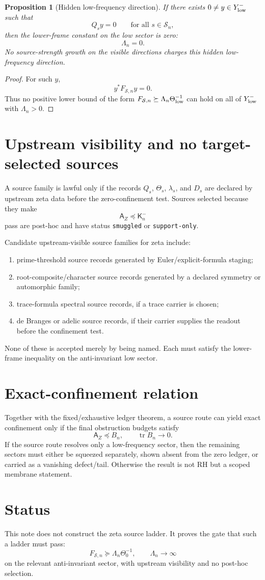 \documentclass[11pt]{article}
\newtheorem{proposition}{Proposition}
\newcommand{\K}{\mathsf K}
\newcommand{\A}{\mathsf A}
\newcommand{\tr}{\operatorname{tr}}
\begin{document}
\begin{proposition}[Hidden low-frequency direction]
If there exists $0\ne y\in Y^-_{\rm low}$ such that
\[
Q_s y=0
\qquad\text{for all }s\in\mathcal S_n,
\]
then the lower-frame constant on the low sector is zero:
\[
\Lambda_n=0.
\]
No source-strength growth on the visible directions charges this hidden low-frequency direction.
\end{proposition}

\begin{proof}
For such $y$,
\[
y^*F_{\mathcal S,n}y=0.
\]
Thus no positive lower bound of the form $F_{\mathcal S,n}\succeq\Lambda_n\Theta_{\rm low}^{-1}$ can hold on all of $Y^-_{\rm low}$ with $\Lambda_n>0$.\end{proof}

\section{Upstream visibility and no target-selected sources}
A source family is lawful only if the records $Q_s$, $\Theta_s$, $\lambda_s$, and $D_s$ are declared by upstream zeta data before the zero-confinement test. Sources selected because they make
\[
\A_Z\preceq \K_n^-
\]
pass are post-hoc and have status \texttt{smuggled} or \texttt{support-only}.

Candidate upstream-visible source families for zeta include:
\begin{enumerate}[label=(\roman*)]
\item prime-threshold source records generated by Euler/explicit-formula staging;
\item root-composite/character source records generated by a declared symmetry or automorphic family;
\item trace-formula spectral source records, if a trace carrier is chosen;
\item de Branges or adelic source records, if their carrier supplies the readout before the confinement test.
\end{enumerate}
None of these is accepted merely by being named. Each must satisfy the lower-frame inequality on the anti-invariant low sector.

\section{Exact-confinement relation}
Together with the fixed/exhaustive ledger theorem, a source route can yield exact confinement only if the final obstruction budgets satisfy
\[
\A_Z\preceq B_n,
\qquad
\tr B_n\to0.
\]
If the source route resolves only a low-frequency sector, then the remaining sectors must either be squeezed separately, shown absent from the zero ledger, or carried as a vanishing defect/tail. Otherwise the result is not RH but a scoped membrane statement.

\section{Status}
This note does not construct the zeta source ladder. It proves the gate that such a ladder must pass:
\[
F_{\mathcal S,n}\succeq \Lambda_n\Theta_0^{-1},
\qquad \Lambda_n\to\infty
\]
on the relevant anti-invariant sector, with upstream visibility and no post-hoc selection.
\end{document}
